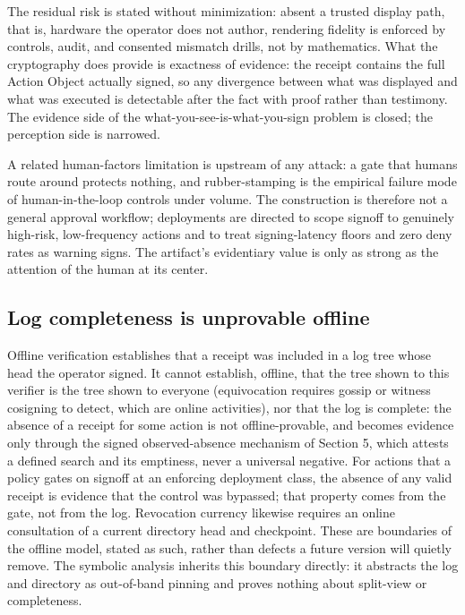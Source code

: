 \documentclass[11pt]{article}
\begin{document}
The residual risk is stated without minimization: absent a trusted display path,
that is, hardware the operator does not author, rendering fidelity is enforced by
controls, audit, and consented mismatch drills, not by mathematics. What the
cryptography does provide is exactness of evidence: the receipt contains the full
Action Object actually signed, so any divergence between what was displayed and what
was executed is detectable after the fact with proof rather than testimony. The
evidence side of the what-you-see-is-what-you-sign problem is closed; the perception
side is narrowed.

A related human-factors limitation is upstream of any attack: a gate that humans
route around protects nothing, and rubber-stamping is the empirical failure mode of
human-in-the-loop controls under volume. The construction is therefore not a general
approval workflow; deployments are directed to scope signoff to genuinely high-risk,
low-frequency actions and to treat signing-latency floors and zero deny rates as
warning signs. The artifact's evidentiary value is only as strong as the attention
of the human at its center.

\subsection{Log completeness is unprovable offline}

Offline verification establishes that a receipt was included in a log tree whose
head the operator signed. It cannot establish, offline, that the tree shown to this
verifier is the tree shown to everyone (equivocation requires gossip or witness
cosigning to detect, which are online activities), nor that the log is complete: the
absence of a receipt for some action is not offline-provable, and becomes evidence
only through the signed observed-absence mechanism of Section 5, which attests a
defined search and its emptiness, never a universal negative. For actions that a
policy gates on signoff at an enforcing deployment class, the absence of any valid
receipt is evidence that the control was bypassed; that property comes from the
gate, not from the log. Revocation currency likewise requires an online consultation
of a current directory head and checkpoint. These are boundaries of the offline
model, stated as such, rather than defects a future version will quietly remove. The
symbolic analysis inherits this boundary directly: it abstracts the log and
directory as out-of-band pinning and proves nothing about split-view or
completeness.
\end{document}
